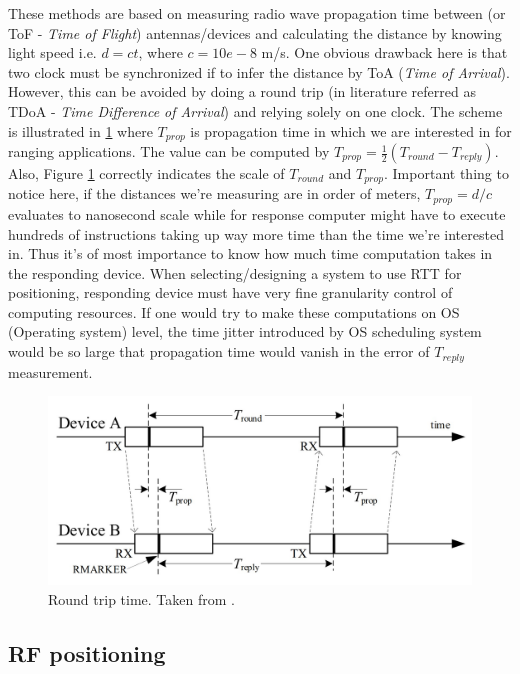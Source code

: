 These methods are based on measuring radio wave propagation time between (or ToF - \emph{Time of Flight}) antennas/devices and calculating the distance by knowing light speed i.e. $d=ct$, where $c=10e-8$ m/s. One obvious drawback here is that two clock must be synchronized if to infer the distance by ToA (\emph{Time of Arrival}). However, this can be avoided by doing a round trip (in literature referred as TDoA - \emph{Time Difference of Arrival}) and relying solely on one clock. The scheme is illustrated in \ref{fig:RTT} where $T_{prop}$ is propagation time in which we are interested in for ranging applications. The value can be computed by $T_{prop} = \frac{1}{2}(T_{round} - T_{reply})$. Also, Figure \ref{fig:RTT} correctly indicates the scale of $T_{round}$ and $T_{prop}$. Important thing to notice here, if the distances we're measuring are in order of meters, $T_{prop} = d/c$ evaluates to nanosecond scale while for response computer might have to execute hundreds of instructions taking up way more time than the time we're interested in. Thus it's of most importance to know how much time computation takes in the responding device. When selecting/designing a system to use RTT for positioning, responding device must have very fine granularity control of computing resources. If one would try to make these computations on OS (Operating system) level, the time jitter introduced by OS scheduling system would be so large that propagation time would vanish in the error of $T_{reply}$ measurement.
\begin{figure}[H]
    \includegraphics[width=\linewidth]{figures/RTT.jpg}
    \caption{Round trip time. Taken from \cite{9179124}.}
    \label{fig:RTT}
\end{figure}
  
\subsection{RF positioning}

